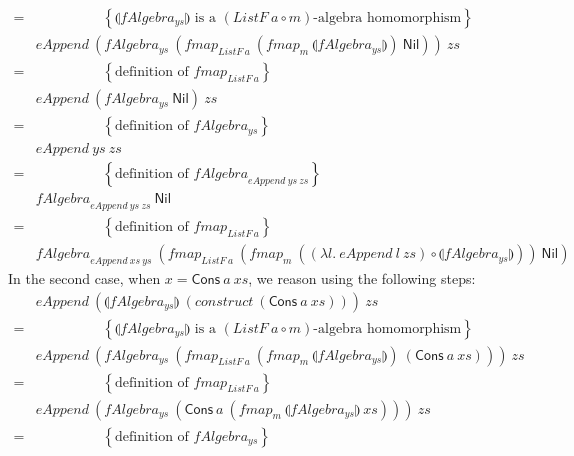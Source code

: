 \documentclass{jfp1}
\newcommand{\fold}[1]{\llparenthesis #1 \rrparenthesis}
\newcommand{\eqAnnotation}[1]{\hspace{2cm}\left\{\textrm{#1}\right\}}
\begin{document}
\begin{proof*}
\begin{displaymath}
\begin{array}{cl}
      =&\eqAnnotation{$\fold{\mathit{fAlgebra_{ys}}}$ is a $(\mathit{ListF}~a \circ m)$-algebra homomorphism} \\
      &\mathit{eAppend}~(\mathit{fAlgebra_{ys}}~(\mathit{fmap}_{\mathit{ListF}~a}~(\mathit{fmap}_m~\fold{\mathit{fAlgebra_{ys}}})~\mathsf{Nil}))~\mathit{zs} \\
      =&\eqAnnotation{definition of $\mathit{fmap_{\mathit{ListF}~a}}$} \\
      &\mathit{eAppend}~(\mathit{fAlgebra_{ys}}~\mathsf{Nil})~\mathit{zs} \\
      =&\eqAnnotation{definition of $\mathit{fAlgebra_{ys}}$} \\
      &\mathit{eAppend}~\mathit{ys}~\mathit{zs} \\
      =&\eqAnnotation{definition of $\mathit{fAlgebra}_{\mathit{eAppend}~\mathit{ys}~\mathit{zs}}$} \\
      &\mathit{fAlgebra}_{\mathit{eAppend}~\mathit{ys}~\mathit{zs}}~\mathsf{Nil} \\
      =&\eqAnnotation{definition of $\mathit{fmap}_{\mathit{ListF}~a}$} \\
      &\mathit{fAlgebra}_{\mathit{eAppend}~\mathit{xs}~\mathit{ys}}~(\mathit{fmap}_{\mathit{ListF}~a}~(\mathit{fmap}_m~((\lambda l.~\mathit{eAppend}~l~\mathit{zs}) \circ \fold{\mathit{fAlgebra_{ys}}}))~\mathsf{Nil})
    \end{array}
  \end{displaymath}
  In the second case, when $x = \mathsf{Cons}~a~\mathit{xs}$, we
  reason using the following steps:
  \begin{displaymath}
    \begin{array}{cl}
      &\mathit{eAppend}~(\fold{\mathit{fAlgebra_{ys}}}~(\mathit{construct}~(\mathsf{Cons}~a~\mathit{xs})))~\mathit{zs} \\
      =&\eqAnnotation{$\fold{\mathit{fAlgebra_{ys}}}$ is a $(\mathit{ListF}~a \circ m)$-algebra homomorphism} \\
      &\mathit{eAppend}~(\mathit{fAlgebra_{ys}}~(\mathit{fmap}_{\mathit{ListF}~a}~(\mathit{fmap}_m~\fold{\mathit{fAlgebra_{ys}}})~(\mathsf{Cons}~a~\mathit{xs})))~\mathit{zs} \\
      =&\eqAnnotation{definition of $\mathit{fmap_{\mathit{ListF}~a}}$} \\
      &\mathit{eAppend}~(\mathit{fAlgebra_{ys}}~(\mathsf{Cons}~a~(\mathit{fmap}_m~\fold{\mathit{fAlgebra_{ys}}}~\mathit{xs})))~\mathit{zs} \\
      =&\eqAnnotation{definition of $\mathit{fAlgebra_{ys}}$} \\

\end{array}
\end{displaymath}
\end{proof*}
\end{document}
